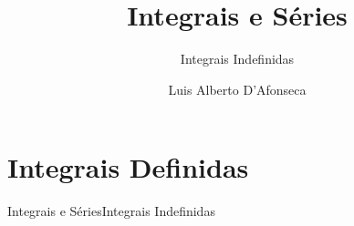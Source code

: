 
\usepackage{apresentacao}
\usepackage{tabto}

\makeatletter
\graphicspath  {{./figs/}}
\makeatother

\newcommand{\mytitle}   {Integrais e Séries}
\newcommand{\mysubtitle}{Integrais Indefinidas}
\title   {\mytitle}
\subtitle{\mysubtitle}
\author  {\large Luis Alberto D'Afonseca}
\date    {}



\begin{frame}
    \titlepage
\end{frame}

\section{Integrais Definidas}

\begin{frame}{\mytitle}{\mysubtitle}
  \tableofcontents
\end{frame}


